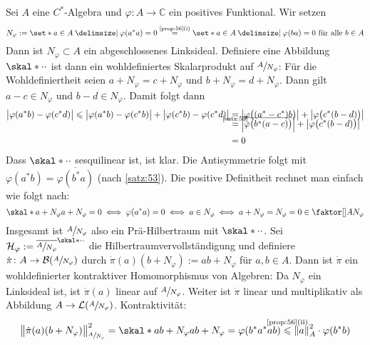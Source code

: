 \begin{satz}[{name={GNS-Konstruktion}},label=gns]
	Sei $A$ eine $C^*$-Algebra und $\varphi \colon A \to \mathbb{C}$ ein positives Funktional. 
	Wir setzen 
	\[
		N_\varphi := \set*{a \in A \given \varphi(a^*a)=0}\StackText{\ref{prop:56}(i)}{=}\set*{a \in A \given \varphi(ba)=0 \text{ für alle }b \in A}
	\]
	Dann ist $N_\varphi \subset A$ ein abgeschlossenes Linksideal. 
	Definiere eine Abbildung
	$\skal*{\cdot}{\cdot}$ ist dann ein wohldefiniertes Skalarprodukt auf $\sfrac{A}{N_\varphi}$:
	Für die Wohldefiniertheit seien $a+N_\varphi=c+N_\varphi$ und $b+N_\varphi=d+N_\varphi$.
	Dann gilt $a-c \in N_\varphi$ und $b-d \in N_\varphi$. Damit folgt dann
	\begin{align}
		\abs[\big]{\varphi(a^*b)-\varphi(c^*d)} \le \abs[\big]{\varphi(a^*b)-\varphi(c^*b)} + \abs[\big]{\varphi(c^*b)- \varphi(c^*d)} &= \abs*{\varphi \enbrace[\big]{(a^*-c^*)b}} + \abs*{\varphi \enbrace[\big]{c^*(b-d)}} \\[-1em]
		&\StackTextClap{\ref{satz:53}}{=} \abs[\Big]{\overline{\varphi \enbrace[\big]{b^*(a-c)}}} + \abs*{\varphi \enbrace[\big]{c^*(b-d)}}\\ &=0
	\end{align}
	Dass $\skal*{\cdot}{\cdot}$ sesquilinear ist, ist klar.
	Die Antisymmetrie folgt mit $\varphi(a^*b)=\overline{\varphi(b^*a)}$ (nach \autoref{satz:53}). 
	Die positive Definitheit rechnet man einfach wie folgt nach:
	\[
		\skal*{a+N_\varphi}{a+N_\varphi}= 0 \iff \varphi(a^*a)=0 \iff a \in N_\varphi \iff a+ N_\varphi = N_\varphi =0 \in \Faktor{A}{N_\varphi}
	\]
	Insgesamt ist $\sfrac{A}{N_\varphi}$ also ein Prä-Hilbertraum mit $\skal*{\cdot}{\cdot}$.
	Sei $\mathcal{H}_\varphi := \overline{\sfrac{A}{N_\varphi}}^{\skal*{\cdot}{\cdot}}$ die Hilbertraumvervollständigung und definiere $\dot{\pi} \colon A \to \mathcal{B}(\sfrac{A}{N_\varphi})$ durch $\dot{\pi}(a)(b+N_\varphi) := ab + N_\varphi$ für $a,b \in A$.
	Dann ist $\dot{\pi}$ ein wohldefinierter kontraktiver Homomorphismus von Algebren:
	Da $N_\varphi$ ein Linksideal ist, ist $\dot{\pi}(a)$ linear auf $\sfrac{A}{N_\varphi}$. Weiter ist $\dot{\pi}$ linear und multiplikativ als Abbildung $A \to \mathcal{L}(\sfrac{A}{N_\varphi})$. Kontraktivität:
	\begin{align}
		\norm[\big]{\dot{\pi}(a)(b+N_\varphi)}^2_{\sfrac{A}{N_\varphi}} = \skal*{ab+N_\varphi}{ab+N_\varphi} = \varphi \enbrace*{b^*a^*ab} &\StackTextClap{\ref{prop:56}(ii)}{\le} \norm*{a}_A^2 \cdot \varphi(b^*b) \\

\end{align}
\end{satz}
